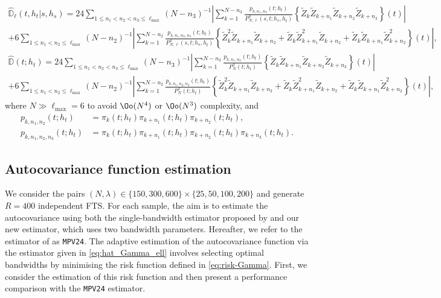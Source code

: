 \begin{multline}
	\widehat{\mathbb{D}}_\ell(t,h_t|s,h_s)  = 24 \!\!\!\!\!\!\!\!\!\!\!\!\!\!\!\!\!\sum_{1\leq n_1<n_2<n_3\leq \ell_{\max}}\!\!\!\!\!\!\!\!\!\!\!\!\!\!\!\!(N - n_3)^{-1}\left|\sum_{k=1}^{N - n_3} \!\! \frac{p_{k,n_1, n_2}(t;h_t)}{P_{N,\ell}^{3}(s, t; h_s, h_t)} \left\{\widetilde{Z}_k \widetilde{Z}_{k + n_1} \widetilde{Z}_{k + n_2} \widetilde{Z}_{k + n_3}\right\}(t) \right| \\
	+ 6 \!\!\!\!\!\!\!\!\!\!\!\!\!\!\sum_{1\leq n_1<n_2\leq \ell_{\max}} \!\!\!\!\!\!\!\!\!\!\!\!\!(N - n_2)^{-1}\left|\sum_{k=1}^{N - n_2} \! \frac{p_{k,n_1, n_2, n_3}(t;h_t)}{P_{N,\ell}^{3}(s, t; h_s, h_t)} \left\{\widetilde{Z}_k^2 \widetilde{Z}_{k + n_1} \widetilde{Z}_{k + n_2} + \widetilde{Z}_k \widetilde{Z}_{k + n_1}^2 \widetilde{Z}_{k + n_2} + \widetilde{Z}_k \widetilde{Z}_{k + n_1} \widetilde{Z}_{k + n_2}^2\right\}(t)\right|,
\end{multline}
\begin{multline}
	\widehat{\mathbb{D}}(t; h_t)  = 24 \!\!\!\!\!\!\!\!\!\!\!\!\!\!\!\!\!\sum_{1\leq n_1<n_2<n_3\leq \ell_{\max}}\!\!\!\!\!\!\!\!\!\!\!\!\!\!\!\!(N - n_3)^{-1}\left|\sum_{k=1}^{N - n_3} \!\! \frac{p_{k,n_1, n_2}(t;h_t)}{P_N^{3}(t; h_t)}\left\{\widetilde{Z}_k \widetilde{Z}_{k + n_1} \widetilde{Z}_{k + n_2} \widetilde{Z}_{k + n_3}\right\}(t) \right| \\ 
	+ 6 \!\!\!\!\!\!\!\!\!\!\!\!\!\!\sum_{1\leq n_1<n_2\leq \ell_{\max}} \!\!\!\!\!\!\!\!\!\!\!\!\!(N - n_2)^{-1}\left|\sum_{k=1}^{N - n_2} \!\frac{p_{k,n_1, n_2, n_3}(t;h_t)}{P_N^{3}(t; h_t)} \left\{\widetilde{Z}_k^2 \widetilde{Z}_{k + n_1} \widetilde{Z}_{k + n_2} + \widetilde{Z}_k \widetilde{Z}_{k + n_1}^2 \widetilde{Z}_{k + n_2} + \widetilde{Z}_k \widetilde{Z}_{k + n_1} \widetilde{Z}_{k + n_2}^2\right\}(t)\right|,
\end{multline}
where $N \gg \ell_{\max} = 6$ to avoid $\Oo(N^4)$ or $\Oo(N^3)$ complexity, and 
\begin{align}
	p_{k,n_1, n_2}(t;h_t) &= \pi_k(t;h_t)\pi_{k+n_1}(t;h_t)\pi_{k+n_2}(t;h_t), \\
	p_{k,n_1, n_2, n_3}(t;h_t) &= \pi_k(t;h_t)\pi_{k+n_1}(t;h_t)\pi_{k+n_2}(t;h_t)\pi_{k+n_3}(t;h_t).
\end{align}

\subsection{Autocovariance function estimation}\label{sec:emp_study:autocov}
We consider the pairs $(N, \lambda) \in \{150, 300, 600\} \times \{25, 50, 100, 200\}$ and generate $R = 400$ independent FTS. For each sample, the aim is to estimate the autocovariance using both the single-bandwidth estimator proposed by \cite{Maissoro2024} and our new estimator, which uses two bandwidth parameters. Hereafter, we refer to the estimator of \cite{Maissoro2024} as \texttt{MPV24}. The adaptive estimation of the autocovariance function via the estimator given in \eqref{eq:hat_Gamma_ell} involves selecting optimal bandwidths by minimising the risk function defined in \eqref{eq:risk-Gamma}. First, we consider the estimation of this risk function and then present a performance comparison with \color{magenta}the \texttt{MPV24} estimator\color{black}.


